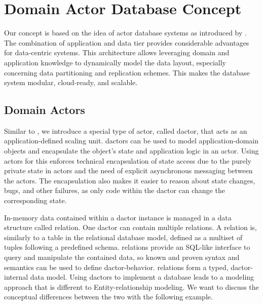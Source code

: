 
\section{Domain Actor Database Concept}\label{sec:concept}
  Our concept is based on the idea of actor database systems as introduced by \citet{manifesto}.
  The combination of application and data tier provides considerable advantages for data-centric systems.
  This architecture allows leveraging domain and application knowledge to dynamically model the data layout, especially concerning data partitioning and replication schemes.
  This makes the database system modular, cloud-ready, and scalable.

  \subsection{Domain Actors}\label{sec:dactors}
    Similar to \citet{Shah:reactdb}, we introduce a special type of actor, called \gls{dactor}, that acts as an application-defined scaling unit.
    \Glspl{dactor} can be used to model application-domain objects and encapsulate the object's state and application logic in an actor.
    Using actors for this enforces technical encapsulation of state access due to the purely private state in actors and the need of explicit asynchronous messaging between the actors.
    The encapsulation also makes it easier to reason about state changes, bugs, and other failures, as only code within the \gls{dactor} can change the corresponding state.

    In-memory data contained within a \gls{dactor} instance is managed in a data structure called \gls{relation}.
    One \gls{dactor} can contain multiple \glspl{relation}.
    A \gls{relation} is, similarly to a table in the relational database model, defined as a multiset of tuples following a predefined schema.
    \Glspl{relation} provide an SQL-like interface to query and manipulate the contained data, so known and proven syntax and semantics can be used to define \gls{dactor}-behavior.
    \Glspl{relation} form a typed, \gls{dactor}-internal data model.
    Using \glspl{dactor} to implement a database leads to a modeling approach that is different to Entity-relationship modeling.
    We want to discuss the conceptual differences between the two with the following example.

